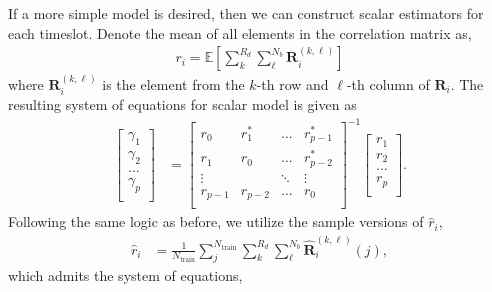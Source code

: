 If a more simple model is desired, then we can construct scalar estimators for each timeslot. Denote the mean of all elements in the correlation matrix as,
\begin{align*}
  r_i = \mathbb{E}\left[\sum_{k}^{R_d} \sum_{\ell}^{N_b}\mathbf{R}_i^{(k,\ell)}\right]
\end{align*}
where $\mathbf{R}_i^{(k, \ell)}$ is the element from the $k$-th row and $\ell$-th column of $\mathbf{R}_i$. The resulting system of equations for scalar model is given as
\begin{align}
  \begin{bmatrix}
    \gamma_{1} \\ \gamma_{2} \\ \dots \\ \gamma_{p} \\
  \end{bmatrix}
  &= 
  \begin{bmatrix}
    r_{0} & r_1^* & \dots  & r_{p-1}^* \\
    r_{1} & r_0   & \dots  & r_{p-2}^* \\
    \vdots      &         & \ddots & \vdots \\
    r_{p-1} & r_{p-2}   & \dots  & r_{0} \\
  \end{bmatrix}^{-1}
  \begin{bmatrix}
    r_{1} \\ r_{2} \\ \dots \\ r_{p} \\
  \end{bmatrix}. \label{eq:toep-sol-scalar}
\end{align}
Following the same logic as before, we utilize the sample versions of $\hat r_i$,
\begin{align*}
  \hat r_i &= \frac{1}{N_{\text{train}}} \sum_{j}^{N_{\text{train}}} \sum_{k}^{R_d} \sum_{\ell}^{N_b}\hat{\mathbf{R}}_i^{(k,\ell)}(j),
\end{align*}
which admits the system of equations,
